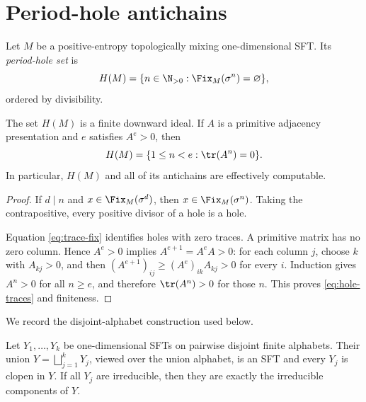 \section{Period-hole antichains}
\label{sec:period-holes}

Let $M$ be a positive-entropy topologically mixing one-dimensional SFT.  Its
\emph{period-hole set} is
\begin{equation}
 H(M)=\{n\in\N_{>0}:\Fix_M(\sigma^n)=\varnothing\},
 \label{eq:hole-set}
\end{equation}
ordered by divisibility.

\begin{proposition}
\label{prop:hole-ideal}
The set $H(M)$ is a finite downward ideal.  If $A$ is a primitive adjacency
presentation and $e$ satisfies $A^e>0$, then
\begin{equation}
 H(M)=\{1\leq n<e:\tr(A^n)=0\}.
 \label{eq:hole-traces}
\end{equation}
In particular, $H(M)$ and all of its antichains are effectively computable.
\end{proposition}

\begin{proof}
If $d\mid n$ and $x\in\Fix_M(\sigma^d)$, then
$x\in\Fix_M(\sigma^n)$.  Taking the contrapositive, every positive divisor of
a hole is a hole.

Equation \eqref{eq:trace-fix} identifies holes with zero traces.  A primitive
matrix has no zero column.  Hence $A^e>0$ implies $A^{e+1}=A^eA>0$: for each
column $j$, choose $k$ with $A_{kj}>0$, and then
$(A^{e+1})_{ij}\geq(A^e)_{ik}A_{kj}>0$ for every $i$.  Induction gives
$A^n>0$ for all $n\geq e$, and therefore $\tr(A^n)>0$ for those $n$.  This
proves \eqref{eq:hole-traces} and finiteness.
\end{proof}

We record the disjoint-alphabet construction used below.

\begin{lemma}
\label{lem:block-diagonal}
Let $Y_1,\ldots,Y_k$ be one-dimensional SFTs on pairwise disjoint finite
alphabets.  Their union $Y=\bigsqcup_{j=1}^kY_j$, viewed over the union
alphabet, is an SFT and every $Y_j$ is clopen in $Y$.  If all $Y_j$ are
irreducible, then they are exactly the irreducible components of $Y$.
\end{lemma}

